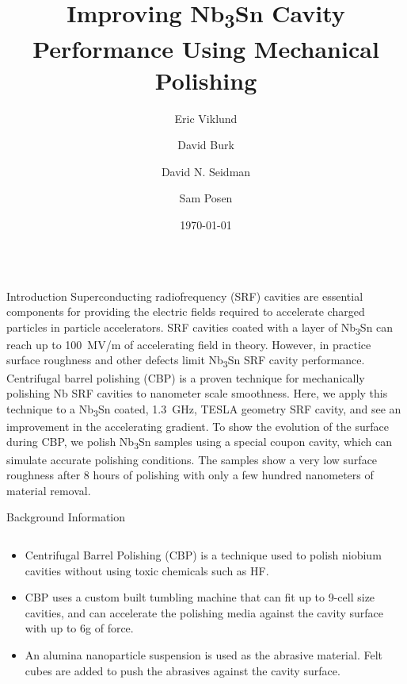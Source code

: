 \documentclass{beamer}
\title{Improving Nb\textsubscript{3}Sn Cavity Performance Using Mechanical Polishing}%
\author{Eric Viklund \inst{1, 2} \and David Burk \inst{2} \and David N. Seidman \inst{1} \and Sam Posen \inst{2}}
\institute[shortinst]{\inst{1} Department of Materials Science and Engineering, Northwestern University \samelineand \inst{2} Fermi National Accelerator Laboratory}
\date{\today}%
\begin{document}
%
    \begin{frame}{}
        \begin{columns}[t]
            \begin{column}{0.32\linewidth}
                \begin{block}{\label{sec:introduction}Introduction}
                    Superconducting radiofrequency (SRF) cavities are essential components for providing the electric fields required to accelerate charged particles in particle accelerators. SRF cavities coated with a layer of Nb\textsubscript{3}Sn can reach up to 100~MV/m of accelerating field in theory. However, in practice surface roughness and other defects limit Nb\textsubscript{3}Sn SRF cavity performance. Centrifugal barrel polishing (CBP) is a proven technique for mechanically polishing Nb SRF cavities to nanometer scale smoothness. Here, we apply this technique to a Nb\textsubscript{3}Sn coated, 1.3~GHz, TESLA geometry SRF cavity, and see an improvement in the accelerating gradient. To show the evolution of the surface during CBP, we polish Nb\textsubscript{3}Sn samples using a special coupon cavity, which can simulate accurate polishing conditions. The samples show a very low surface roughness after 8 hours of polishing with only a few hundred nanometers of material removal.
                \end{block}
                \begin{block}{\label{sec:backgroundinformation}Background Information}
                    \begin{columns}[t]
                        \begin{column}{0.45\columnwidth}
                            \begin{itemize}
                                \item Centrifugal Barrel Polishing (CBP) is a technique used to polish niobium cavities without using toxic chemicals such as HF.
                                \item CBP uses a custom built tumbling machine that can fit up to 9-cell size cavities, and can accelerate the polishing media against the cavity surface with up to 6g of force.
                                \item An alumina nanoparticle suspension is used as the abrasive material. Felt cubes are added to push the abrasives against the cavity surface.

\end{itemize}
\end{column}
\end{columns}
\end{block}
\end{column}
\end{columns}
\end{frame}
\end{document}
